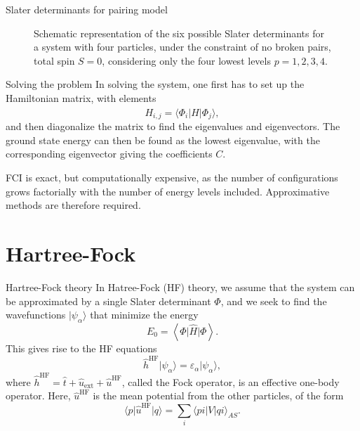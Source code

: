 \documentclass[UKenglish,aspectratio=169]{beamer}
\begin{document}
\begin{frame}{Slater determinants for pairing model}
    \begin{figure}[htbp]
        \centering
        
        \caption{
            Schematic representation of the six possible Slater determinants for a system with four particles, under the constraint of no broken pairs, total spin $S = 0$, considering only the four lowest levels $p = 1, 2, 3, 4$.\label{fig:SDs}
        }
    \end{figure}
\end{frame}

\begin{frame}{Solving the problem}
    In solving the system, one first has to set up the Hamiltonian matrix, with elements
    \begin{equation}
        H_{i, j} = \langle \Phi_i \lvert \hat{H} \rvert \Phi_j \rangle,
    \end{equation}
    and then diagonalize the matrix to find the eigenvalues and eigenvectors.
    The ground state energy can then be found as the lowest eigenvalue, with the corresponding eigenvector giving the coefficients $C$.

    \bigskip

    FCI is exact, but computationally expensive, as the number of configurations grows factorially with the number of energy levels included.
    Approximative methods are therefore required.
\end{frame}

\section{Hartree-Fock}

\begin{frame}{Hartree-Fock theory}
    In Hatree-Fock (HF) theory, we assume that the system can be approximated by a single Slater determinant $\Phi$, and we seek to find the wavefunctions $\lvert \psi_\alpha \rangle$ that minimize the energy
    \begin{equation}
        E_0 = \left\langle \Phi \vert \hat{H} \vert \Phi \right\rangle.
    \end{equation}
    This gives rise to the HF equations
    \begin{equation}\label{eq:HF_equations}
        \hat{h}^\mathrm{HF} \lvert \psi_\alpha \rangle = \varepsilon_\alpha \lvert \psi_\alpha \rangle,
    \end{equation}
    where $\hat{h}^\mathrm{HF} = \hat{t} + \hat{u}_{\mathrm{ext}} + \hat{u}^\mathrm{HF}$, called the Fock operator, is an effective one-body operator.
    Here, $\hat{u}^\mathrm{HF}$ is the mean potential from the other particles, of the form
    \begin{equation}\label{eq:HFpotential}
        \langle p \vert \hat{u}^\mathrm{HF} \vert q \rangle = \sum_{i} \langle pi \vert V \vert qi \rangle_{AS}.
    \end{equation}
\end{frame}
\end{document}
